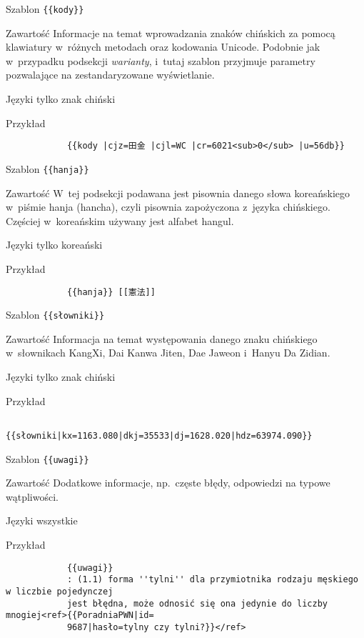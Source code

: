 \documentclass{pracamgr}
\begin{document}
\spacer
\begin{opis}
	\item[Szablon] \verb|{{kody}}|
	\item[Zawartość] Informacje na temat wprowadzania znaków chińskich za pomocą klawiatury w~różnych metodach oraz kodowania Unicode. Podobnie jak w~przypadku podsekcji \emph{warianty}, i~tutaj szablon przyjmuje parametry pozwalające na zestandaryzowane wyświetlanie.
	\item[Języki] tylko znak chiński
	\item[Przykład]
		\begin{verbatim}
			{{kody |cjz=田金 |cjl=WC |cr=6021<sub>0</sub> |u=56db}}
		\end{verbatim}
\end{opis}
\spacer
\begin{opis}
	\item[Szablon] \verb|{{hanja}}|
	\item[Zawartość] W~tej podsekcji podawana jest pisownia danego słowa koreańskiego w~piśmie hanja (hancha), czyli pisownia zapożyczona z~języka chińskiego. Częściej w~koreańskim używany jest alfabet hangul.
	\item[Języki] tylko koreański
	\item[Przykład]
		\begin{verbatim}
			{{hanja}} [[憲法]]
		\end{verbatim}
\end{opis}
\spacer
\begin{opis}
	\item[Szablon] \verb|{{słowniki}}|
	\item[Zawartość] Informacja na temat występowania danego znaku chińskiego w~słownikach KangXi, Dai Kanwa Jiten, Dae Jaweon i~Hanyu Da Zidian.
	\item[Języki] tylko znak chiński
	\item[Przykład]
		\begin{verbatim}
			{{słowniki|kx=1163.080|dkj=35533|dj=1628.020|hdz=63974.090}}
		\end{verbatim}
\end{opis}
\spacer
\begin{opis}
	\item[Szablon] \verb|{{uwagi}}|
	\item[Zawartość] Dodatkowe informacje, np.\ częste błędy, odpowiedzi na typowe wątpliwości.
	\item[Języki] wszystkie
	\item[Przykład]
		\begin{verbatim}
			{{uwagi}}
			: (1.1) forma ''tylni'' dla przymiotnika rodzaju męskiego w liczbie pojedynczej
			jest błędna, może odnosić się ona jedynie do liczby mnogiej<ref>{{PoradniaPWN|id=
			9687|hasło=tylny czy tylni?}}</ref>
		\end{verbatim}
\end{opis}
\end{document}
